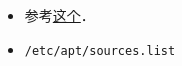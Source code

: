 
\begin{issues}
\issueDraft
\end{issues}


\begin{itemize}
\item 参考\href{https://itsfoss.com/ppa-guide/}{这个}．
\item \verb|/etc/apt/sources.list|
\end{itemize}
